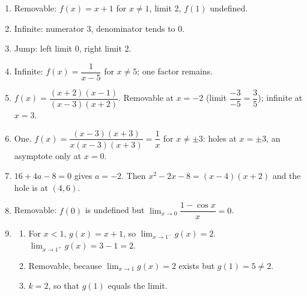 \documentclass[11pt]{article}
\begin{document}
\newpage
\begin{solbox}
\begin{enumerate}[leftmargin=*,itemsep=4pt]
  \item Removable: $f(x)=x+1$ for $x\neq1$, limit 2, $f(1)$ undefined.
  \item Infinite: numerator 3, denominator tends to 0.
  \item Jump: left limit 0, right limit 2.
  \item Infinite: $f(x)=\dfrac{1}{x-5}$ for $x\neq5$; one factor remains.
  \item $f(x)=\dfrac{(x+2)(x-1)}{(x-3)(x+2)}$. Removable at $x=-2$ (limit $\dfrac{-3}{-5}=\dfrac35$); infinite at $x=3$.
  \item One. $f(x)=\dfrac{(x-3)(x+3)}{x(x-3)(x+3)}=\dfrac1x$ for $x\neq\pm3$: holes at $x=\pm3$, an asymptote only at $x=0$.
  \item $16+4a-8=0$ gives $a=-2$. Then $x^2-2x-8=(x-4)(x+2)$ and the hole is at $(4,6)$.
  \item Removable: $f(0)$ is undefined but $\displaystyle\lim_{x\to 0}\dfrac{1-\cos x}{x}=0$.
  \item \begin{enumerate}[label=(\alph*),leftmargin=*,itemsep=3pt]
    \item For $x<1$, $g(x)=x+1$, so $\displaystyle\lim_{x\to 1^-}g(x)=2$. $\displaystyle\lim_{x\to 1^+}g(x)=3-1=2$.
    \item Removable, because $\displaystyle\lim_{x\to 1}g(x)=2$ exists but $g(1)=5\neq2$.
    \item $k=2$, so that $g(1)$ equals the limit.
  \end{enumerate}
\end{enumerate}
\end{solbox}
\end{document}
